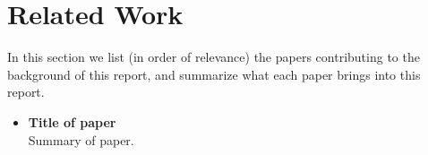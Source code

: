 \section{Related Work}

In this section we list (in order of relevance) the papers contributing to the
background of this report, and summarize what each paper brings into this
report.

\begin{itemize}

	\item \textbf{Title of paper} \\
	Summary of paper.

\end{itemize}
